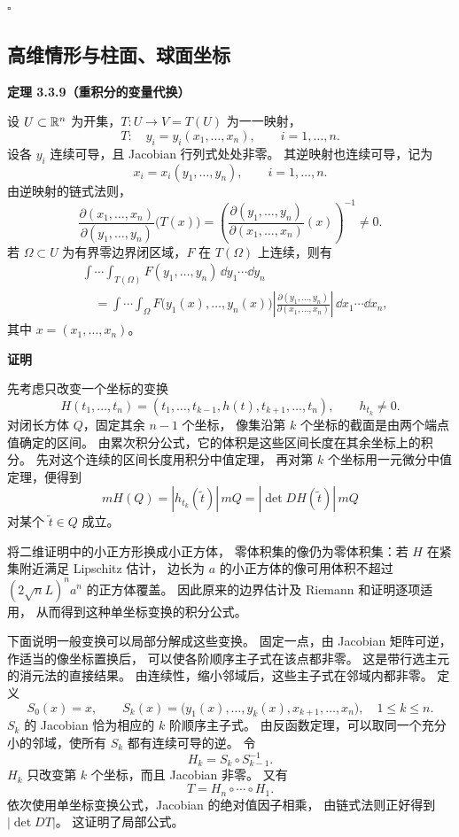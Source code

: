 $\square$



\subsection*{高维情形与柱面、球面坐标}



\textbf{定理 3.3.9（重积分的变量代换）}


设 $U\subset\mathbb{R}^n$ 为开集，$T:U\to V=T(U)$ 为一一映射，
\[
T:\quad y_i=y_i(x_1,\ldots,x_n),\qquad i=1,\ldots,n.
\]
设各 $y_i$ 连续可导，且 Jacobian 行列式处处非零。
其逆映射也连续可导，记为
\[
x_i=x_i(y_1,\ldots,y_n),\qquad i=1,\ldots,n.
\]
由逆映射的链式法则，
\[
\frac{\partial(x_1,\ldots,x_n)}{\partial(y_1,\ldots,y_n)}\bigl(T(x)\bigr)
=\left(\frac{\partial(y_1,\ldots,y_n)}{\partial(x_1,\ldots,x_n)}(x)\right)^{-1}
\ne0.
\]
若 $\Omega\subset U$ 为有界零边界闭区域，$F$ 在 $T(\Omega)$ 上连续，则有
\[
\begin{aligned}
&\int\cdots\int_{T(\Omega)}F(y_1,\ldots,y_n)\,\dd y_1\cdots\dd y_n\\
&\quad=\int\cdots\int_\Omega
 F\bigl(y_1(x),\ldots,y_n(x)\bigr)
 \left|\frac{\partial(y_1,\ldots,y_n)}{\partial(x_1,\ldots,x_n)}\right|
 \,\dd x_1\cdots\dd x_n,
\end{aligned}
\]
其中 $x=(x_1,\ldots,x_n)$。





\textbf{证明}

先考虑只改变一个坐标的变换
\[
H(t_1,\ldots,t_n)
=(t_1,\ldots,t_{k-1},h(t),t_{k+1},\ldots,t_n),
\qquad h_{t_k}\ne0.
\]
对闭长方体 $Q$，固定其余 $n-1$ 个坐标，
像集沿第 $k$ 个坐标的截面是由两个端点值确定的区间。
由累次积分公式，它的体积是这些区间长度在其余坐标上的积分。
先对这个连续的区间长度用积分中值定理，
再对第 $k$ 个坐标用一元微分中值定理，便得到
\[
mH(Q)=|h_{t_k}(\widetilde t)|\,mQ
=|\det DH(\widetilde t)|\,mQ
\]
对某个 $\widetilde t\in Q$ 成立。

将二维证明中的小正方形换成小正方体，
零体积集的像仍为零体积集：若 $H$ 在紧集附近满足 Lipschitz 估计，
边长为 $a$ 的小正方体的像可用体积不超过
$(2\sqrt nL)^na^n$ 的正方体覆盖。
因此原来的边界估计及 Riemann 和证明逐项适用，
从而得到这种单坐标变换的积分公式。

下面说明一般变换可以局部分解成这些变换。
固定一点，由 Jacobian 矩阵可逆，作适当的像坐标置换后，
可以使各阶顺序主子式在该点都非零。
这是带行选主元的消元法的直接结果。
由连续性，缩小邻域后，这些主子式在邻域内都非零。
定义
\[
S_0(x)=x,\qquad
S_k(x)=\bigl(y_1(x),\ldots,y_k(x),x_{k+1},\ldots,x_n\bigr),
\quad 1\le k\le n.
\]
$S_k$ 的 Jacobian 恰为相应的 $k$ 阶顺序主子式。
由反函数定理，可以取同一个充分小的邻域，使所有 $S_k$ 都有连续可导的逆。
令
\[
H_k=S_k\circ S_{k-1}^{-1}.
\]
$H_k$ 只改变第 $k$ 个坐标，而且 Jacobian 非零。
又有
\[
T=H_n\circ\cdots\circ H_1.
\]
依次使用单坐标变换公式，Jacobian 的绝对值因子相乘，
由链式法则正好得到 $|\det DT|$。
这证明了局部公式。

